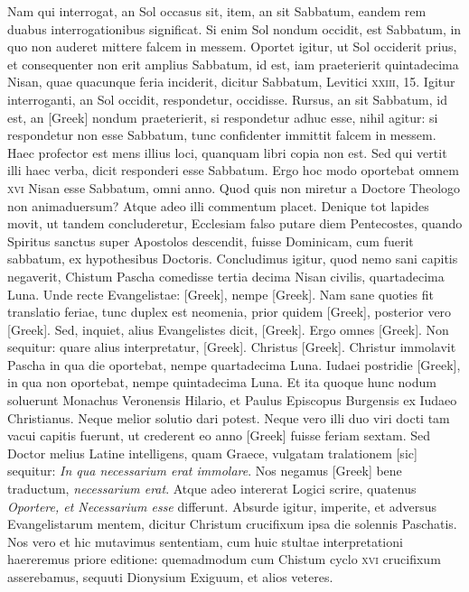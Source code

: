 \begin{parnumbers}
{}
\lnr{}Nam qui interrogat,
an Sol occasus sit, item, an sit Sabbatum, eandem rem duabus interrogationibus
significat.
\lnr{}Si enim Sol nondum occidit, est Sabbatum,
in quo non auderet mittere falcem in messem.
\lnr{}Oportet igitur,
ut Sol occiderit prius, et consequenter non erit amplius Sabbatum,
id est, iam praeterierit quintadecima Nisan, quae quacunque feria
inciderit, dicitur Sabbatum, Levitici \textsc{xxiii}, 15.
\lnr{}Igitur interroganti,
an Sol occidit, respondetur, occidisse.
\lnr{}Rursus, an sit Sabbatum, id
est, an \textgreek{[Greek]} nondum praeterierit, si respondetur adhuc
esse, nihil agitur: si respondetur non esse Sabbatum, tunc confidenter
immittit falcem in messem.
\lnr{}Haec profector est mens illius loci,
quanquam libri copia non est.
\lnr{}Sed qui vertit illi haec verba, dicit responderi
esse Sabbatum.
\lnr{}Ergo hoc modo oportebat omnem \textsc{xvi}
Nisan esse Sabbatum, omni anno.
\lnr{}Quod quis non miretur a Doctore
Theologo non animaduersum?
\lnr{}Atque adeo illi commentum
placet.
\lnr{}Denique tot lapides movit, ut tandem concluderetur, Ecclesiam
falso putare diem Pentecostes, quando Spiritus sanctus super
Apostolos descendit, fuisse Dominicam, cum fuerit sabbatum, ex
hypothesibus Doctoris.
\lnr{}Concludimus igitur, quod nemo sani capitis
negaverit, Chistum Pascha comedisse tertia decima Nisan civilis,
quartadecima Luna.
\lnr{}Unde recte Evangelistae: \textgreek{[Greek]},
nempe \textgreek{[Greek]}.
\lnr{}Nam sane quoties fit translatio feriae,
tunc duplex est neomenia, prior quidem \textgreek{[Greek]}, posterior vero
\textgreek{[Greek]}.
\lnr{}Sed, inquiet, alius Evangelistes dicit, \textgreek{[Greek]}.
\lnr{}Ergo omnes \textgreek{[Greek]}.
\lnr{}Non sequitur: quare alius interpretatur, \textgreek{[Greek]}.
\lnr{}Christus \textgreek{[Greek]}.
\lnr{}Christur immolavit Pascha in qua die
oportebat, nempe quartadecima Luna.
\lnr{}Iudaei postridie \textgreek{[Greek]},
in qua non oportebat, nempe quintadecima Luna.
\lnr{}Et ita quoque
hunc nodum soluerunt Monachus Veronensis Hilario, et Paulus
Episcopus Burgensis ex Iudaeo Christianus.
\lnr{}Neque melior solutio
dari potest.
\lnr{}Neque vero illi duo viri docti tam vacui capitis fuerunt,
ut crederent eo anno \textgreek{[Greek]} fuisse feriam sextam.
\lnr{}Sed Doctor melius Latine intelligens, quam Graece, vulgatam tralationem [sic]
sequitur: \textit{In qua necessarium erat immolare}.
\lnr{}Nos negamus
\textgreek{[Greek]} bene traductum, \textit{necessarium erat}.
\lnr{}Atque adeo intererat Logici
scrire, quatenus \textit{Oportere, et Necessarium esse} differunt.
\lnr{}Absurde igitur, imperite, et adversus Evangelistarum mentem, dicitur
Christum crucifixum ipsa die solennis Paschatis.
\lnr{}Nos vero et
hic mutavimus sententiam, cum huic stultae interpretationi haereremus
priore editione: quemadmodum cum Chistum cyclo \textsc{xvi} crucifixum
asserebamus, sequuti Dionysium Exiguum, et alios veteres.


\end{parnumbers}
